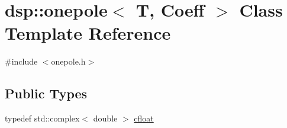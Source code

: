 \hypertarget{classdsp_1_1onepole}{}\section{dsp\+:\+:onepole$<$ T, Coeff $>$ Class Template Reference}
\label{classdsp_1_1onepole}


{\ttfamily \#include $<$onepole.\+h$>$}

\subsection*{Public Types}
\begin{DoxyCompactItemize}
\item 
typedef std\+::complex$<$ double $>$ \hyperlink{classdsp_1_1onepole_aa3ec578cfbf7c9821819c7fb6fef5bfb}{cfloat}
\end{DoxyCompactItemize}
